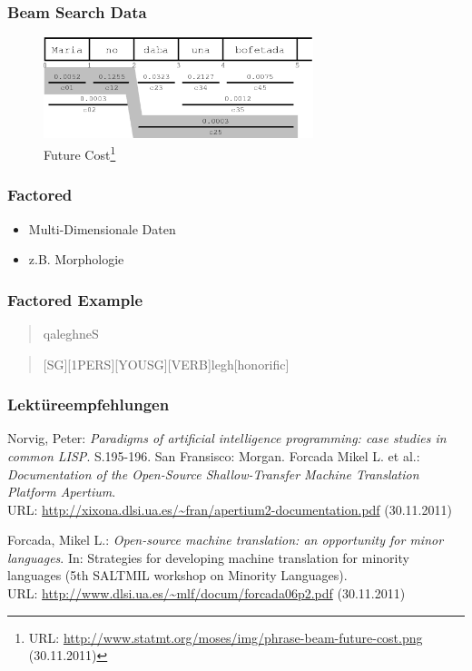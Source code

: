 \documentclass{beamer}
\begin{document}
\begin{frame}
  \frametitle{Beam Search Data}
  \begin{figure}
  \includegraphics[width=0.70\textwidth]{graphics/future_cost}
  \caption{Future Cost\footnote{URL:
      \url{http://www.statmt.org/moses/img/phrase-beam-future-cost.png} (30.11.2011)}}
  \end{figure}
\end{frame}
\begin{frame}
  \frametitle{Factored}
  \begin{itemize}
    \item Multi-Dimensionale Daten
    \item z.B. Morphologie
  \end{itemize}
\end{frame}
\begin{frame}
  \frametitle{Factored Example}
  
  \begin{quote}
    qaleghneS
  \end{quote}
  \begin{quote}
    [SG][1PERS][YOUSG][VERB]legh[honorific]
  \end{quote}
\end{frame}
\begin{frame}
  \frametitle{Lektüreempfehlungen}

\begin{thebibliography}{...............}
\small
{}
Norvig, Peter: \emph{Paradigms of artificial intelligence programming: case studies in common LISP}. S.195-196. San Fransisco: Morgan.
Forcada Mikel L. et al.: \emph{Documentation of the Open-Source Shallow-Transfer Machine Translation Platform Apertium}.\\
URL: \url{http://xixona.dlsi.ua.es/~fran/apertium2-documentation.pdf} (30.11.2011)

Forcada, Mikel L.: \emph{Open-source machine translation: an opportunity for minor languages}. In: Strategies for developing machine translation for minority languages (5th SALTMIL workshop on Minority Languages).\\URL: \url{http://www.dlsi.ua.es/~mlf/docum/forcada06p2.pdf} (30.11.2011)
\end{thebibliography}

\end{frame}
\end{document}
